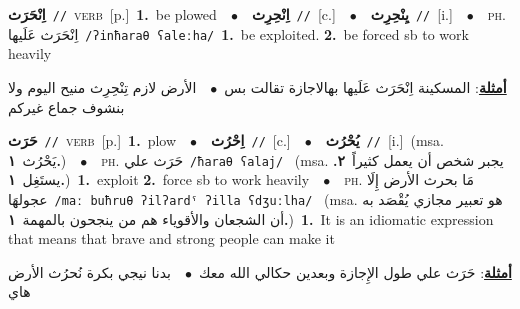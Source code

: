 \documentclass[10pt,a4paper,twoside]{article} %
\begin{document}
\begin{multicols}{2}
{\setlength\topsep{0pt}\textbf{\foreignlanguage{arabic}{اِنْحَرَث}}\ {\color{gray}\texttt{//}\color{black}}\ \textsc{verb}\ [p.]\ \textbf{1.}~be plowed\ \ $\bullet$\ \ \setlength\topsep{0pt}\textbf{\foreignlanguage{arabic}{اِنْحِرِث}}\ {\color{gray}\texttt{//}\color{black}}\ [c.]\ \ $\bullet$\ \ \setlength\topsep{0pt}\textbf{\foreignlanguage{arabic}{يِنْحِرِث}}\ {\color{gray}\texttt{//}\color{black}}\ [i.]\ \ $\bullet$\ \ \textsc{ph.} \color{gray} \foreignlanguage{arabic}{اِنْحَرَث عَلَيها}\color{black}\ {\color{gray}\texttt{/{\sffamily ʔinħaraθ ʕaleːha}/}\color{black}}\ \textbf{1.}~be exploited.  \textbf{2.}~be forced sb to work heavily\  \begin{flushright}\color{gray}\foreignlanguage{arabic}{\textbf{\underline{\foreignlanguage{arabic}{أمثلة}}}: المسكينة اِنْحَرَث عَلَيها بهالاجازة تقالت بس\ $\bullet$\ \  الأرض لازم تِنْحِرِث منيح اليوم ولا بنشوف جماع غيركم}\end{flushright}\color{black}} \vspace{2mm}

{\setlength\topsep{0pt}\textbf{\foreignlanguage{arabic}{حَرَث}}\ {\color{gray}\texttt{//}\color{black}}\ \textsc{verb}\ [p.]\ \textbf{1.}~plow\ \ $\bullet$\ \ \setlength\topsep{0pt}\textbf{\foreignlanguage{arabic}{اِحْرُث}}\ {\color{gray}\texttt{//}\color{black}}\ [c.]\ \ $\bullet$\ \ \setlength\topsep{0pt}\textbf{\foreignlanguage{arabic}{يُحْرُث}}\ {\color{gray}\texttt{//}\color{black}}\ [i.]\ \color{gray}(msa. \foreignlanguage{arabic}{يَحْرُث}~\foreignlanguage{arabic}{\textbf{١.}})\color{black}\ \ $\bullet$\ \ \textsc{ph.} \color{gray} \foreignlanguage{arabic}{حَرَث علي}\color{black}\ {\color{gray}\texttt{/{\sffamily ħaraθ ʕalaj}/}\color{black}}\ \color{gray} (msa. \foreignlanguage{arabic}{يجبر شخص أن يعمل كثيراً}~\foreignlanguage{arabic}{\textbf{٢.}}  \foreignlanguage{arabic}{يستَغِل}~\foreignlanguage{arabic}{\textbf{١.}})\color{black}\ \textbf{1.}~exploit  \textbf{2.}~force sb to work heavily\ \ $\bullet$\ \ \textsc{ph.} \color{gray} \foreignlanguage{arabic}{مَا بحرث الأرض إِلَا عجولهَا}\color{black}\ {\color{gray}\texttt{/{\sffamily maː buħruθ ʔilʔardˤ ʔilla ʕdʒuːlha}/}\color{black}}\ \color{gray} (msa. \foreignlanguage{arabic}{هو تعبير مجازي يُقْصَد به أن الشجعان والأقوياء هم من ينجحون بالمهمة}~\foreignlanguage{arabic}{\textbf{١.}})\color{black}\ \textbf{1.}~It is an idiomatic expression that means that brave and strong people can make it\  \begin{flushright}\color{gray}\foreignlanguage{arabic}{\textbf{\underline{\foreignlanguage{arabic}{أمثلة}}}: حَرَث علي طول الإِجازة وبعدين حكالي الله معك\ $\bullet$\ \  بدنا نيجي بكرة نُحرُث الأرض هاي}\end{flushright}\color{black}} \vspace{2mm}


\end{multicols}
\end{document}
